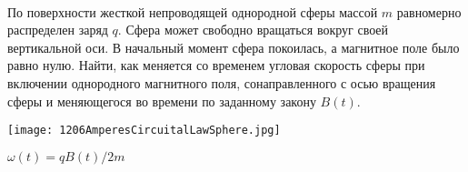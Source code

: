 \begin{ex}
\hspace{0pt} \\
\begin{minipage}{.65\textwidth}
По поверхности жесткой непроводящей однородной сферы массой $m$ равномерно распределен заряд $q$. 
Сфера может свободно вращаться вокруг своей вертикальной оси. В начальный момент сфера покоилась, а магнитное поле было равно нулю. 
Найти, как меняется со временем угловая скорость сферы при включении однородного магнитного поля, 
сонаправленного с осью вращения сферы и меняющегося во времени по заданному закону $B(t)$.
\end{minipage}
\begin{minipage}{.35\textwidth}
\centering
\texttt{[image: 1206AmperesCircuitalLawSphere.jpg]}
\end{minipage}
\begin{ans}
$\omega(t) = qB(t)/2m$
\end{ans}
\end{ex}